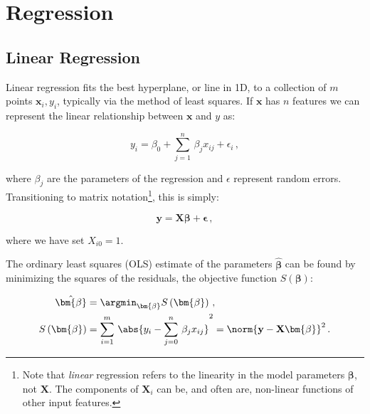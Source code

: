 \chapter{Regression}
\label{chap:regression}

\section{Linear Regression}
\label{regression:linear}

Linear regression fits the best hyperplane, or line in 1D,
to a collection of $m$ points $\mathbf{x}_{i}, y_{i}$,
typically via the method of least squares.
If $\mathbf{x}$ has $n$ features we can represent the
linear relationship between $\mathbf{x}$ and $y$ as:

\begin{equation}\label{eq:linear:one_point}
y_{i} = \beta_{0} + \sum_{j=1}^{n}\, \beta_{j} x_{ij} + \epsilon_{i}\,,
\end{equation}

\noindent where $\beta_{j}$ are the parameters of the regression
and $\epsilon$ represent random errors.
Transitioning to matrix notation\footnote{Note
that \textit{linear} regression refers to the linearity in the model parameters
$\bm{\beta}$, not $\mathbf{X}$.
The components of $\mathbf{X}_{i}$ can be, and often are,
non-linear functions of other input features.}, this is simply:

\begin{equation}\label{eq:linear:matrix}
\mathbf{y} = \mathbf{X} \bm{\beta} + \bm{\epsilon}\,,
\end{equation}

\noindent where we have set $X_{i0} =1$.

The ordinary least squares (OLS) estimate of the parameters $\hat{\bm{\beta}}$
can be found by minimizing the squares of the residuals,
\ie the objective function $S\left(\bm{\beta}\right)$:

\begin{subequations} \label{eq:linear:ols}
\begin{align}
\hat{\bm{\beta}} &= \argmin_{\bm{\beta}} S\left(\bm{\beta}\right)\,, \label{eq:linear:argmin} \\
S\left(\bm{\beta}\right) &= \sum_{i=1}^{m} \, \abs{y_{i} - \sum_{j=0}^{n} \, \beta_{j} x_{ij}}^{2} = \norm{\mathbf{y} - \mathbf{X} \bm{\beta}}^{2}\,. \label{eq:linear:S}
\end{align}
\end{subequations}

